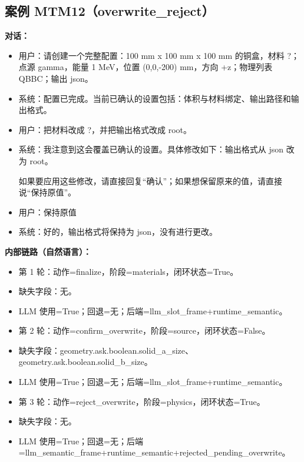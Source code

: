 \documentclass[11pt]{ctexart}
\begin{document}
\subsection{案例 MTM12（overwrite\_reject）}
\textbf{对话：}
\begin{itemize}
\item 用户：请创建一个完整配置：100 mm x 100 mm x 100 mm 的铜盒，材料 ?；点源 gamma，能量 1 MeV，位置 (0,0,-200) mm，方向 +z；物理列表 QBBC；输出 json。
\item 系统：配置已完成。当前已确认的设置包括：体积与材料绑定、输出路径和输出格式。
\item 用户：把材料改成 ?，并把输出格式改成 root。
\item 系统：我注意到这会覆盖已确认的设置。具体修改如下：输出格式从 json 改为 root。

如果要应用这些修改，请直接回复“确认”；如果想保留原来的值，请直接说“保持原值”。
\item 用户：保持原值
\item 系统：好的，输出格式将保持为 json，没有进行更改。
\end{itemize}
\textbf{内部链路（自然语言）：}
\begin{itemize}
\item 第 1 轮：动作=finalize，阶段=materials，闭环状态=True。
\item 缺失字段：无。
\item LLM 使用=True；回退=无；后端=llm\_slot\_frame+runtime\_semantic。
\item 第 2 轮：动作=confirm\_overwrite，阶段=source，闭环状态=False。
\item 缺失字段：geometry.ask.boolean.solid\_a\_size、geometry.ask.boolean.solid\_b\_size。
\item LLM 使用=True；回退=无；后端=llm\_slot\_frame+runtime\_semantic。
\item 第 3 轮：动作=reject\_overwrite，阶段=physics，闭环状态=True。
\item 缺失字段：无。
\item LLM 使用=True；回退=无；后端=llm\_semantic\_frame+runtime\_semantic+rejected\_pending\_overwrite。
\end{itemize}
\end{document}
